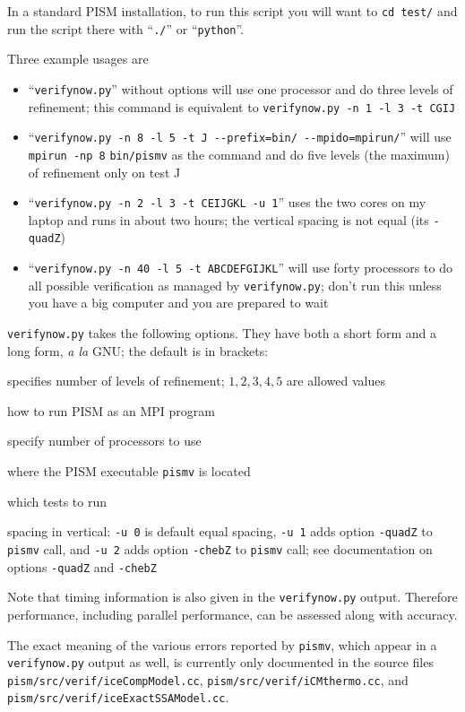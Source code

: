 \documentclass[11pt,final]{amsart}
\begin{document}
In a standard PISM installation, to run this script you will want to \verb|cd test/| and run the script there with ``\verb|./|'' or ``\verb|python|''.

Three example usages are \begin{itemize}
\item ``\verb|verifynow.py|'' without options will use one processor and do three levels of refinement; this command is equivalent to \verb|verifynow.py -n 1 -l 3 -t CGIJ|
\item ``\verb|verifynow.py -n 8 -l 5 -t J --prefix=bin/ --mpido=mpirun/|'' will use \verb|mpirun -np 8| \verb|bin/pismv| as the command and do five levels (the maximum) of refinement only on test J
\item ``\verb|verifynow.py -n 2 -l 3 -t CEIJGKL -u 1|'' uses the two cores on my laptop and runs in about two hours; the vertical spacing is not equal (its \verb|-quadZ|)
\item ``\verb|verifynow.py -n 40 -l 5 -t ABCDEFGIJKL|'' will use forty processors to do all possible verification as managed by \verb|verifynow.py|; don't run this unless you have a big computer and you are prepared to wait
\end{itemize}

\opthead  \verb|verifynow.py| takes the following options.  They have both a short form and a long form, \emph{a la} GNU; the default is in brackets:

 specifies number of levels of refinement; $1,2,3,4,5$ are allowed values

 how to run PISM as an MPI program

 specify number of processors to use

 where the PISM executable \verb|pismv| is located

 which tests to run

 spacing in vertical: \verb|-u 0| is default equal spacing, \verb|-u 1| adds option \verb|-quadZ| to \verb|pismv| call, and \verb|-u 2| adds option \verb|-chebZ| to \verb|pismv| call; see documentation on options \verb|-quadZ| and  \verb|-chebZ|

\medskip
Note that timing information is also given in the \verb|verifynow.py| output.  Therefore performance, including parallel performance, can be assessed along with accuracy.

The exact meaning of the various errors reported by \verb|pismv|, which appear in a \verb|verifynow.py| output as well, is currently only documented in the source files \verb|pism/src/verif/iceCompModel.cc|, \verb|pism/src/verif/iCMthermo.cc|, and \verb|pism/src/verif/iceExactSSAModel.cc|.  
\end{document}
